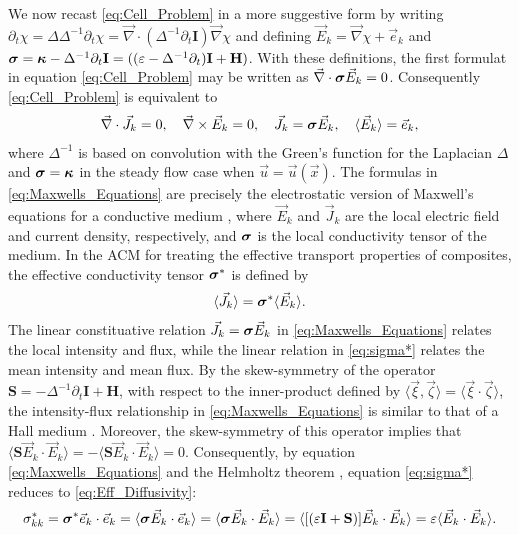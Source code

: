 \documentclass[11pt]{amsart}
\newcommand{\Hb}{\mathbf{H}}
\newcommand{\Ib}{\mathbf{I}}
\newcommand\bsig{\mbox{\boldmath${\sigma}$}}
\newcommand\bkappa{\mbox{\boldmath${\kappa}$}}
\begin{document}
We now recast \eqref{eq:Cell_Problem} 
in a more suggestive form by writing 
$\partial_t\chi=\Delta\Delta^{-1}\partial_t\chi=\vec{\nabla}\cdot(\Delta^{-1}\partial_t\Ib)\vec{\nabla}\chi$ and defining
$\vec{E}_k=\vec{\nabla}\chi+\vec{e}_k$ and 
$\bsig=\bkappa-\Delta^{-1}\partial_t\Ib=((\varepsilon-\Delta^{-1}\partial_t)\Ib+\Hb)$. With these
definitions, the first formulat in equation \eqref{eq:Cell_Problem}
may be written as $\vec{\nabla}\cdot\bsig\vec{E}_k=0$. Consequently
\eqref{eq:Cell_Problem} is equivalent to \cite{Fannjiang:SIAM_JAM:333}    
%
\begin{align}\label{eq:Maxwells_Equations}    
  \vec{\nabla}\cdot\vec{J}_k=0, \quad
  \vec{\nabla}\times\vec{E}_k=0, \quad
  \vec{J}_k=\bsig\vec{E}_k,\quad
  \langle\vec{E}_k\rangle=\vec{e}_k,
\end{align}
%
where $\Delta^{-1}$ is based on convolution with the Green's function for
the Laplacian $\Delta$ and $\bsig=\bkappa$ in the steady flow
case when $\vec{u}=\vec{u}(\vec{x})$. The formulas in
\eqref{eq:Maxwells_Equations} are  
precisely the electrostatic version of Maxwell's equations for a
conductive medium \cite{Golden:CMP-473}, where $\vec{E}_k$ and
$\vec{J}_k$ are the local electric field and current density,
respectively, and $\bsig$ is the local conductivity tensor of the
medium. In the ACM for treating the effective transport properties of
composites, the effective conductivity tensor $\bsig^*$ is defined by 
%
\begin{align}\label{eq:sigma*}
  \langle\vec{J}_k\rangle=\bsig^*\langle\vec{E}_k\rangle.
\end{align}
%
The linear constituative relation $\vec{J}_k=\bsig\vec{E}_k$ in
\eqref{eq:Maxwells_Equations} relates the local intensity and flux,
while the linear relation in \eqref{eq:sigma*} relates the mean
intensity and mean flux. By the skew-symmetry of the operator
$\mathbf{S}=-\Delta^{-1}\partial_t\Ib+\Hb$, with respect to the inner-product
defined by $\langle\vec{\xi},\vec{\zeta}\rangle=\langle\vec{\xi}\cdot\vec{\zeta}\rangle$, the intensity-flux
relationship in \eqref{eq:Maxwells_Equations} is similar to
that of a Hall medium \cite{Isichenko:JNS:1991:375}. Moreover, the
skew-symmetry of this operator implies that
$\langle\mathbf{S}\vec{E}_k\cdot\vec{E}_k\rangle=-\langle\mathbf{S}\vec{E}_k\cdot\vec{E}_k\rangle=0$. Consequently,
by equation \eqref{eq:Maxwells_Equations} and the Helmholtz theorem
\cite{Golden:CMP-473,Denaro:2003:0271,Bhatia:IEE:1077}, equation
\eqref{eq:sigma*} reduces to \eqref{eq:Eff_Diffusivity}:    
%
\begin{align}
  \sigma^*_{kk}=\bsig^*\vec{e}_k\cdot\vec{e}_k 
       =\langle\bsig\vec{E}_k\cdot\vec{e}_k\rangle
       =\langle\bsig\vec{E}_k\cdot\vec{E}_k\rangle
       =\langle[(\varepsilon\Ib+\mathbf{S})]\vec{E}_k\cdot\vec{E}_k\rangle
       =\varepsilon\langle\vec{E}_k\cdot\vec{E}_k\rangle.
\end{align}
\end{document}

